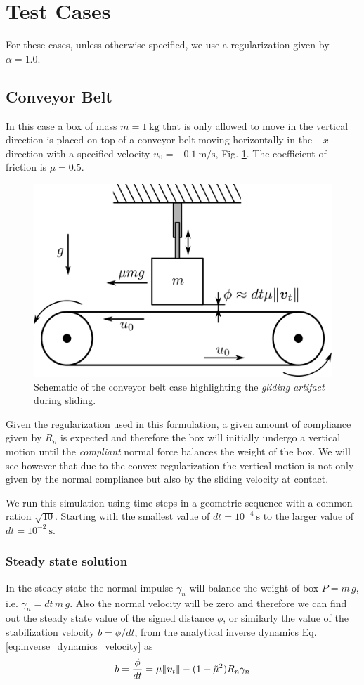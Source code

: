 
\section{Test Cases}
\label{sec:test_cases}

For these cases, unless otherwise specified, we use a regularization given by
$\alpha=1.0$. 

\subsection{Conveyor Belt}
\label{sec:conveyor_belt}

In this case a box of mass $m=1~\text{kg}$ that is only allowed to move in the
vertical direction is placed on top of a conveyor belt moving horizontally in
the $-x$ direction with a specified velocity $u_0=-0.1~\text{m}/\text{s}$, Fig.
\ref{fig:conveyor_belt}. The coefficient of friction is $\mu=0.5$.

\begin{figure}[!h]
	\centering
	\includegraphics[width=0.4\columnwidth]{figures/conveyor_belt/conveyor_belt.png}
	\caption{\label{fig:conveyor_belt} 
	Schematic of the conveyor belt case highlighting the \textit{gliding
	artifact} during sliding.}
\end{figure}

Given the regularization used in this formulation, a given amount of compliance
given by $R_n$ is expected and therefore the box will initially undergo a
vertical motion until the \textit{compliant} normal force balances the weight of
the box. We will see however that due to the convex regularization the vertical
motion is not only given by the normal compliance but also by the sliding
velocity at contact.

We run this simulation using time steps in a geometric sequence with a common
ration $\sqrt{10}$. Starting with the smallest value of $dt = 10^{-4}~\text{s}$
to the larger value of $dt = 10^{-2}~\text{s}$.

\subsubsection{Steady state solution}
In the steady state the normal impulse $\gamma_n$ will balance the weight of box
$P=m\,g$, i.e. $\gamma_n=dt\,m\,g$. Also the normal velocity will be zero and
therefore we can find out the steady state value of the signed distance $\phi$,
or similarly the value of the stabilization velocity $b=\phi/dt$, from the
analytical inverse dynamics Eq. \ref{eq:inverse_dynamics_velocity} as
\begin{eqnarray}
	b=\frac{\phi}{dt}=\mu\Vert{\bm{v}}_t\Vert-(1+\tilde\mu^2)R_n\gamma_n
\end{eqnarray}

